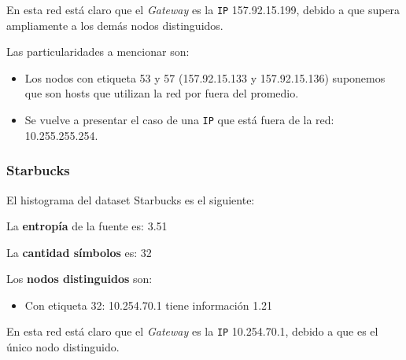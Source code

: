 En esta red está claro que el \textit{Gateway} es la \texttt{IP} 157.92.15.199, debido a que
supera ampliamente a los demás nodos distinguidos.

Las particularidades a mencionar son:
\begin{itemize}
    \item Los nodos con etiqueta 53 y 57 (157.92.15.133 y 157.92.15.136) suponemos
        que son hosts que utilizan la red por fuera del promedio.
    \item  Se vuelve a presentar el caso de una \texttt{IP} que está fuera de la red: 10.255.255.254.
\end{itemize}



\subsubsection{Starbucks}

El histograma del dataset Starbucks es el siguiente:

\begin{center}
\end{center}


La \textbf{entropía} de la fuente es: 3.51

La \textbf{cantidad símbolos} es: 32

Los \textbf{nodos distinguidos} son:

\begin{itemize}
    \item Con etiqueta 32: 10.254.70.1 tiene información 1.21
\end{itemize}

En esta red está claro que el \textit{Gateway} es la \texttt{IP} 10.254.70.1, debido a que
es el único nodo distinguido.
